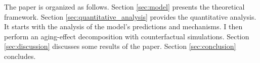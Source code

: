 
The paper is organized as follows. Section \ref{sec:model} presents the theoretical framework. Section \ref{sec:quantitative_analysis} provides the quantitative analysis. It starts with the analysis of the model's predictions and mechanisms. I then perform an aging-effect decomposition with counterfactual simulations. Section \ref{sec:discussion} discusses some results of the paper. Section \ref{sec:conclusion} concludes.








